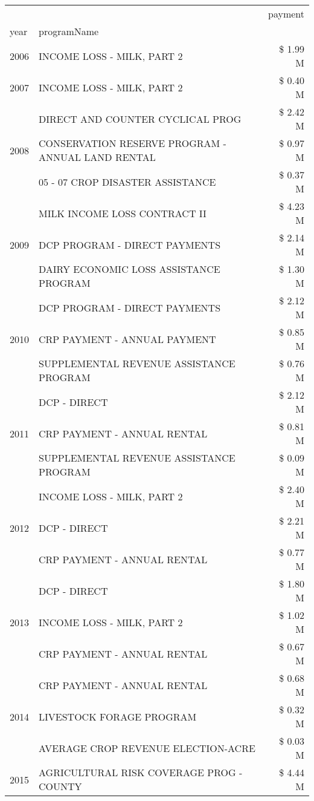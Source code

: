 \begin{tabular}{llr}
\toprule
 &  & payment \\
year & programName &  \\
\midrule
2006 & INCOME LOSS - MILK, PART 2 & \$ 1.99 M \\
\cline{1-3}
2007 & INCOME LOSS - MILK, PART 2 & \$ 0.40 M \\
\cline{1-3}
\multirow[t]{3}{*}{2008} & DIRECT AND COUNTER CYCLICAL PROG & \$ 2.42 M \\
 & CONSERVATION RESERVE PROGRAM - ANNUAL LAND RENTAL & \$ 0.97 M \\
 & 05 - 07 CROP DISASTER ASSISTANCE & \$ 0.37 M \\
\cline{1-3}
\multirow[t]{3}{*}{2009} & MILK INCOME LOSS CONTRACT II & \$ 4.23 M \\
 & DCP PROGRAM - DIRECT PAYMENTS & \$ 2.14 M \\
 & DAIRY ECONOMIC LOSS ASSISTANCE PROGRAM & \$ 1.30 M \\
\cline{1-3}
\multirow[t]{3}{*}{2010} & DCP PROGRAM - DIRECT PAYMENTS & \$ 2.12 M \\
 & CRP PAYMENT - ANNUAL PAYMENT & \$ 0.85 M \\
 & SUPPLEMENTAL REVENUE ASSISTANCE PROGRAM & \$ 0.76 M \\
\cline{1-3}
\multirow[t]{3}{*}{2011} & DCP - DIRECT & \$ 2.12 M \\
 & CRP PAYMENT - ANNUAL RENTAL & \$ 0.81 M \\
 & SUPPLEMENTAL REVENUE ASSISTANCE PROGRAM & \$ 0.09 M \\
\cline{1-3}
\multirow[t]{3}{*}{2012} & INCOME LOSS - MILK, PART 2 & \$ 2.40 M \\
 & DCP - DIRECT & \$ 2.21 M \\
 & CRP PAYMENT - ANNUAL RENTAL & \$ 0.77 M \\
\cline{1-3}
\multirow[t]{3}{*}{2013} & DCP - DIRECT & \$ 1.80 M \\
 & INCOME LOSS - MILK, PART 2 & \$ 1.02 M \\
 & CRP PAYMENT - ANNUAL RENTAL & \$ 0.67 M \\
\cline{1-3}
\multirow[t]{3}{*}{2014} & CRP PAYMENT - ANNUAL RENTAL & \$ 0.68 M \\
 & LIVESTOCK FORAGE PROGRAM & \$ 0.32 M \\
 & AVERAGE CROP REVENUE ELECTION-ACRE & \$ 0.03 M \\
\cline{1-3}
\multirow[t]{3}{*}{2015} & AGRICULTURAL RISK COVERAGE PROG - COUNTY & \$ 4.44 M \\

\end{tabular}
